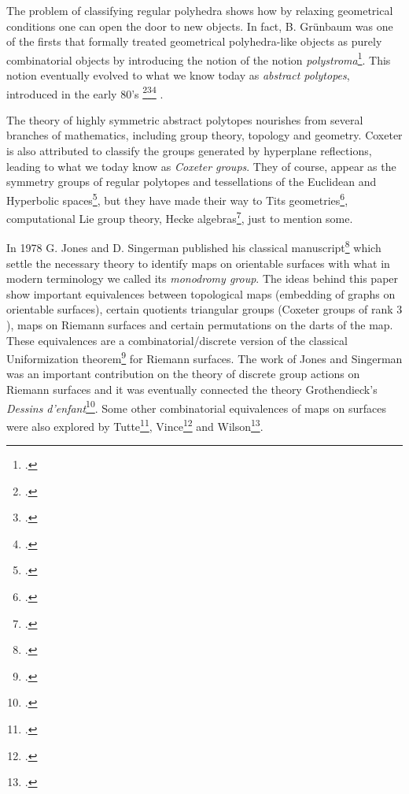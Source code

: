 The problem of classifying regular polyhedra shows how by relaxing geometrical conditions one can open the door to new objects.
In fact, B. Grünbaum was one of the firsts that formally treated geometrical polyhedra-like objects as purely combinatorial objects by introducing the notion of the notion \emph{polystroma}\footcite{Gruenbaum_1978_RegularityGraphsComplexes}.
This notion eventually evolved to what we know today as \emph{abstract polytopes}, introduced in the early 80's
\footcite{Schulte_1980_RegulareInzidenzkomplexe_PhDThesis}\footcite{DanzerSchulte_1982_RegulareInzidenzkomplexe.I}\footcite{Schulte_1983_RegulareInzidenzkomplexe.Ii} .

The theory of highly symmetric abstract polytopes nourishes from several branches of mathematics, including group theory, topology and geometry.
Coxeter is also attributed to classify the groups generated by hyperplane reflections, leading to what we today know as \emph{Coxeter groups}.
They of course, appear as the symmetry groups of regular polytopes and tessellations of the Euclidean and Hyperbolic spaces\footcite{Humphreys_1990_ReflectionGroupsCoxeter}, but they have made their way to Tits geometries\footcite{Tits_1974_BuildingsSphericalType}, computational Lie group theory, Hecke algebras\footcite{Cohen_1991_CoxeterGroupsThree}, just to mention some.

In 1978 G. Jones and D. Singerman published his classical manuscript\footcite{JonesSingerman_1978_TheoryMapsOrientable} which settle the necessary theory to identify maps on orientable surfaces with what in modern terminology we called its \emph{monodromy group}.
The ideas behind this paper show important equivalences between topological maps (embedding of graphs on orientable surfaces), certain quotients triangular groups (Coxeter groups of rank $3$), maps on Riemann surfaces and certain permutations on the darts of the map.
These equivalences are a combinatorial/discrete version of the classical Uniformization theorem\footcite{Abikoff_1981_UniformizationTheorem} for Riemann surfaces.
The work of Jones and Singerman was an important contribution on the theory of discrete group actions on Riemann surfaces and it was eventually connected the theory Grothendieck's \emph{Dessins d'enfant}\footcite{JonesWolfart_2016_DessinsDenfantsRiemann}.
Some other combinatorial equivalences of maps on surfaces were also explored by Tutte\footcite{Tutte_1973_WhatIsMap}, Vince\footcite{Vince_1983_CombinatorialMaps}  and  Wilson\footcite{Wilson_2012_ManiplexesPart1}.

